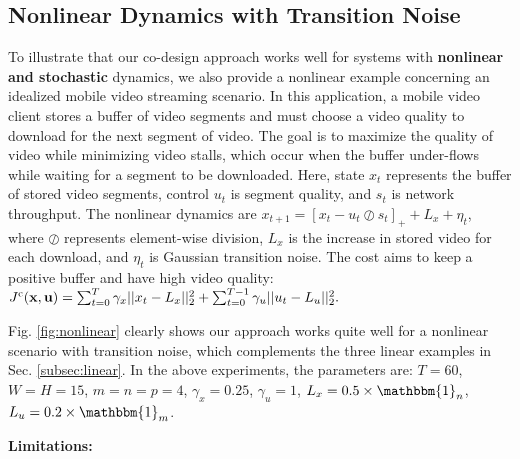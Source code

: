 \subsection{Nonlinear Dynamics with Transition Noise}
\label{subsec:nonlinear}



To illustrate that our co-design approach works well for systems with \textbf{nonlinear and stochastic} dynamics, we also provide a nonlinear
example concerning an idealized mobile video streaming scenario. In this application, a mobile video client stores a buffer of video segments and must choose a video quality to download for the next segment of video. The goal is to maximize the quality of video while minimizing video stalls, which occur when the buffer under-flows while waiting for a segment to be downloaded. Here, state $x_t$ represents the buffer of stored video segments, control $u_t$ is segment quality, and $s_t$ is network throughput. The nonlinear dynamics are $x_{t+1} = [ x_{t} - u_t \oslash s_t ]_+ + L_x + \eta_{t}$, where $\oslash$ represents element-wise division, $L_x$ is the increase in stored video for each download, and $\eta_t$ is Gaussian transition noise. The cost aims to keep a positive buffer and have high video quality:
    $J^{\mathrm{c}}(\bold{x}, \bold{u}) = \sum_{t=0}^{T} \gamma_x \vert\vert x_t - L_x \vert\vert^2_2  + \sum_{t=0}^{T-1} \gamma_u \vert\vert u_t - L_u\vert\vert^2_2.$

Fig. \ref{fig:nonlinear} clearly shows our approach works quite well for a nonlinear scenario with transition noise, which complements the three linear examples in Sec. \ref{subsec:linear}. In the above experiments, the parameters are: $T=60$, $W = H = 15$, $m=n=p=4$, $\gamma_x = 0.25$, $\gamma_u = 1$, $L_x = 0.5 \times \mathbbm{1}_n$, $L_u = 0.2 \times \mathbbm{1}_m$. 

\textbf{Limitations: }  

